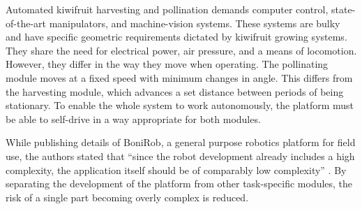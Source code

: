 \documentclass[preprint,authoryear,12pt]{elsarticle}
\begin{document}
    Automated kiwifruit harvesting and pollination demands computer control, state-of-the-art manipulators, and machine-vision systems.
    These systems are bulky and have specific geometric requirements dictated by kiwifruit growing systems.
    They share the need for electrical power, air pressure, and a means of locomotion.
    However, they differ in the way they move when operating.
    The pollinating module moves at a fixed speed with minimum changes in angle.
    This differs from the harvesting module, which advances a set distance between periods of being stationary.
    To enable the whole system to work autonomously, the platform must be able to self-drive in a way appropriate for both modules.

    While publishing details of BoniRob, a general purpose robotics platform for field use, the authors stated that ``since the robot development already includes a high complexity, the application itself should be of comparably low complexity'' \citep{Ruckelshausen2009}.
    By separating the development of the platform from other task-specific modules, the risk of a single part becoming overly complex is reduced.
\end{document}
